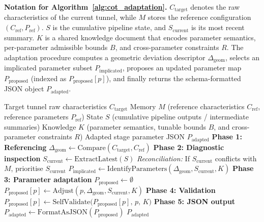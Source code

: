 \documentclass[a4paper,fleqn]{cas-dc}
\begin{document}
{\noindent\textbf{Notation for Algorithm~\ref{alg:cot_adaptation}.} $C_{\text{target}}$ denotes the raw characteristics of the current tunnel, while $M$ stores the reference configuration $(C_{\text{ref}}, P_{\text{ref}})$. $S$ is the cumulative pipeline state, and $S_{\text{current}}$ is its most recent summary. $K$ is a shared knowledge document that encodes parameter semantics, per-parameter admissible bounds $B$, and cross-parameter constraints $R$. The adaptation procedure computes a geometric deviation descriptor $\Delta_{\text{geom}}$, selects an implicated parameter subset $P_{\text{implicated}}$, proposes an updated parameter map $P_{\text{proposed}}$ (indexed as $P_{\text{proposed}}[p]$), and finally returns the schema-formatted JSON object $P_{\text{adapted}}$.

\begin{algorithm}[ht]
\caption{LLM-driven Parameter Adaptation via CoT}\label{alg:cot_adaptation}
\begin{algorithmic}[1]
\Require Target tunnel raw characteristics $C_{\text{target}}$
\Require Memory $M$ (reference characteristics $C_{\text{ref}}$, reference parameters $P_{\text{ref}}$)
\Require State $S$ (cumulative pipeline outputs / intermediate summaries)
\Require Knowledge $K$ (parameter semantics, tunable bounds $B$, and cross-parameter constraints $R$)
\Ensure Adapted stage parameter JSON $P_{\text{adapted}}$
\State \textbf{Phase 1: Referencing}
\State $\Delta_{\text{geom}} \gets \text{Compare}(C_{\text{target}}, C_{\text{ref}})$ 
\State \textbf{Phase 2: Diagnostic inspection}
\State $S_{\text{current}} \gets \text{ExtractLatest}(S)$ 
\State \textit{Reconciliation:} If $S_{\text{current}}$ conflicts with $M$, prioritise $S_{\text{current}}$
\State $P_{\text{implicated}} \gets \text{IdentifyParameters}(\Delta_{\text{geom}}, S_{\text{current}}, K)$ 
\State \textbf{Phase 3: Parameter adaptation}
\State $P_{\text{proposed}} \gets \emptyset$
    \State $P_{\text{proposed}}[p] \gets \text{Adjust}(p, \Delta_{\text{geom}}, S_{\text{current}}, K)$ 
\EndFor
\State \textbf{Phase 4: Validation}
    \State $P_{\text{proposed}}[p] \gets \text{SelfValidate}\big(P_{\text{proposed}}[p],\, p,\, K\big)$
\EndFor
\State \textbf{Phase 5: JSON output}
\State $P_{\text{adapted}} \gets \text{FormatAsJSON}(P_{\text{proposed}})$
\State \Return $P_{\text{adapted}}$
\end{algorithmic}
\end{algorithm}


}
\end{document}
